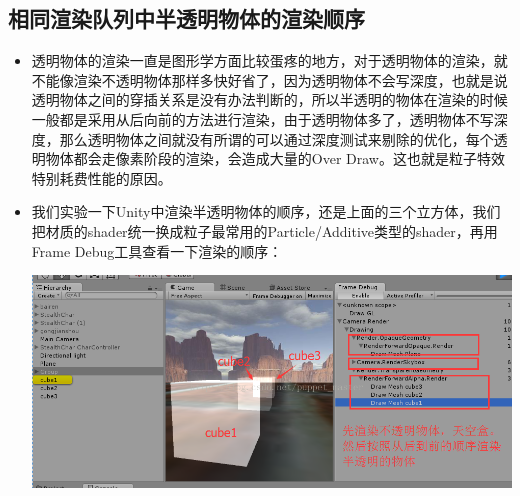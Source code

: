 \documentclass[9pt, b5paper]{article}
\begin{document}
\subsection{相同渲染队列中半透明物体的渲染顺序}
\label{sec-2-4}
\begin{itemize}
\item 透明物体的渲染一直是图形学方面比较蛋疼的地方，对于透明物体的渲染，就不能像渲染不透明物体那样多快好省了，因为透明物体不会写深度，也就是说透明物体之间的穿插关系是没有办法判断的，所以半透明的物体在渲染的时候一般都是采用从后向前的方法进行渲染，由于透明物体多了，透明物体不写深度，那么透明物体之间就没有所谓的可以通过深度测试来剔除的优化，每个透明物体都会走像素阶段的渲染，会造成大量的Over Draw。这也就是粒子特效特别耗费性能的原因。
\item 我们实验一下Unity中渲染半透明物体的顺序，还是上面的三个立方体，我们把材质的shader统一换成粒子最常用的Particle/Additive类型的shader，再用Frame Debug工具查看一下渲染的顺序：

\includegraphics[width=.9\linewidth]{./pic/renderQueue2.png}
\end{itemize}
\end{document}
